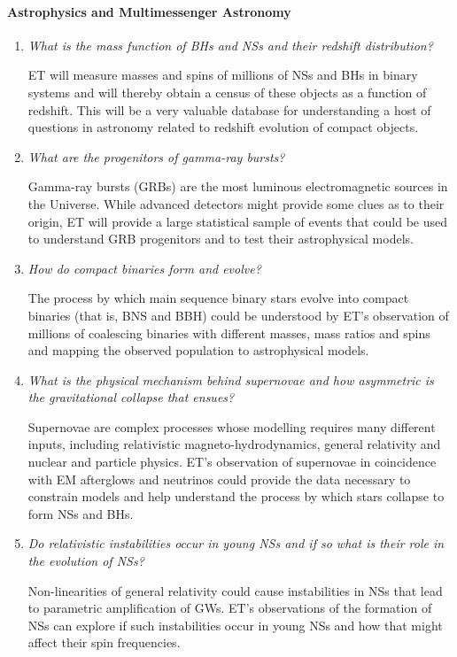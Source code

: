 \paragraph {\bf Astrophysics and Multimessenger Astronomy}
\begin{enumerate}
\item {\em What is the mass function of BHs and NSs and
their redshift distribution?}

ET will measure masses and spins of millions of NSs and BHs
in binary systems and will thereby obtain a census of these objects as a function of
redshift. This will be a very valuable database for understanding a host of questions
in astronomy related to redshift evolution of compact objects. 

\item {\em What are the progenitors of gamma-ray bursts?}

Gamma-ray bursts (GRBs) are the most luminous electromagnetic sources in the
Universe. While advanced detectors might provide some clues as to their
origin, ET will provide a large statistical sample of events that
could be used to understand GRB progenitors and to test their astrophysical models. 

\item {\em How do compact binaries form and evolve?}

The process by which main sequence binary stars evolve into compact 
binaries (that is, BNS and BBH)
could be understood by ET's observation of millions of coalescing
binaries with different masses, mass ratios and spins and mapping the
observed population to astrophysical models.

\item {\em What is the physical mechanism behind supernovae and how asymmetric 
is the gravitational collapse that ensues?}

Supernovae are complex processes whose modelling requires many 
different inputs, including relativistic magneto-hydrodynamics, general relativity
and nuclear and particle physics. 
ET's observation of supernovae in coincidence with EM afterglows and 
neutrinos could provide the data necessary to constrain models and help
understand the process by which stars collapse to form NSs and BHs.

\item {\em Do relativistic instabilities occur in young NSs and if so 
what is their role in the evolution of NSs?}

Non-linearities of general relativity could cause instabilities in 
NSs that lead to parametric amplification of GWs.
ET's observations of the formation of NSs can explore if such
instabilities occur in young NSs and how that might affect
their spin frequencies.


\end{enumerate}
